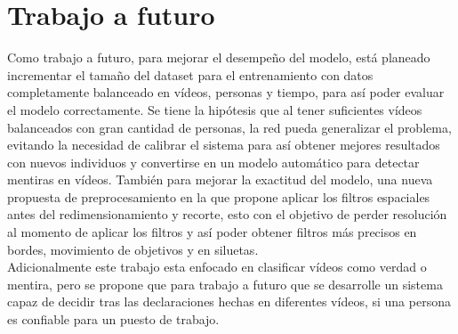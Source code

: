 \chapter{Trabajo a futuro}
\label{TrabajoFuturo} 

Como trabajo a futuro, para mejorar el desempeño del modelo, está planeado incrementar el tamaño del dataset para el entrenamiento con datos completamente balanceado en vídeos, personas y tiempo, para así poder evaluar el modelo correctamente. Se tiene la hipótesis que al tener suficientes vídeos balanceados con gran cantidad de personas, la red pueda generalizar el problema, evitando la necesidad de calibrar el sistema para así obtener mejores resultados con nuevos individuos y convertirse en un modelo automático para detectar mentiras en vídeos. También para mejorar la exactitud del modelo, una nueva propuesta de preprocesamiento en la que propone aplicar los filtros espaciales antes del redimensionamiento y recorte, esto con el objetivo de perder resolución al momento de aplicar los filtros y así poder obtener filtros más precisos en bordes, movimiento de objetivos y en siluetas. \\

Adicionalmente este trabajo esta enfocado en clasificar vídeos como verdad o mentira, pero se propone que para trabajo a futuro que se desarrolle un sistema capaz de decidir tras las declaraciones hechas en diferentes vídeos, si una persona es confiable para un puesto de trabajo.\\